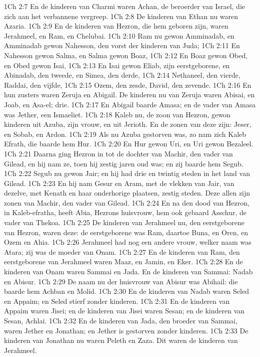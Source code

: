 1Ch 2:7  En de kinderen van Charmi waren Achan, de beroerder van Israel, die zich aan het verbannene vergreep.
1Ch 2:8  De kinderen van Ethan nu waren Azaria.
1Ch 2:9  En de kinderen van Hezron, die hem geboren zijn, waren Jerahmeel, en Ram, en Chelubai.
1Ch 2:10  Ram nu gewon Amminadab, en Amminadab gewon Nahesson, den vorst der kinderen van Juda;
1Ch 2:11  En Nahesson gewon Salma, en Salma gewon Boaz,
1Ch 2:12  En Boaz gewon Obed, en Obed gewon Isai,
1Ch 2:13  En Isai gewon Eliab, zijn eerstgeborene, en Abinadab, den tweede, en Simea, den derde,
1Ch 2:14  Nethaneel, den vierde, Raddai, den vijfde,
1Ch 2:15  Ozem, den zesde, David, den zevende.
1Ch 2:16  En hun zusters waren Zeruja en Abigail. De kinderen nu van Zeruja waren Abisai, en Joab, en Asa-el; drie.
1Ch 2:17  En Abigail baarde Amasa; en de vader van Amasa was Jether, een Ismaeliet.
1Ch 2:18  Kaleb nu, de zoon van Hezron, gewon kinderen uit Azuba, zijn vrouw, en uit Jerioth. En de zonen van deze zijn: Jeser, en Sobab, en Ardon.
1Ch 2:19  Als nu Azuba gestorven was, zo nam zich Kaleb Efrath, die baarde hem Hur.
1Ch 2:20  En Hur gewon Uri, en Uri gewon Bezaleel.
1Ch 2:21  Daarna ging Hezron in tot de dochter van Machir, den vader van Gilead, en hij nam ze, toen hij zestig jaren oud was; en zij baarde hem Segub.
1Ch 2:22  Segub nu gewon Jair; en hij had drie en twintig steden in het land van Gilead.
1Ch 2:23  En hij nam Gesur en Aram, met de vlekken van Jair, van dezelve, met Kenath en haar onderhorige plaatsen, zestig steden. Deze allen zijn zonen van Machir, den vader van Gilead.
1Ch 2:24  En na den dood van Hezron, in Kaleb-efratha, heeft Abia, Hezrons huisvrouw, hem ook gebaard Asschur, de vader van Thekoa.
1Ch 2:25  De kinderen van Jerahmeel nu, den eerstgeborene van Hezron, waren deze: de eerstgeborene was Ram, daartoe Buna, en Oren, en Ozem en Ahia.
1Ch 2:26  Jerahmeel had nog een andere vrouw, welker naam was Atara; zij was de moeder van Onam.
1Ch 2:27  En de kinderen van Ram, den eerstgeborene van Jerahmeel waren Maaz, en Jamin, en Eker.
1Ch 2:28  En de kinderen van Onam waren Sammai en Jada. En de kinderen van Sammai: Nadab en Abisur.
1Ch 2:29  De naam nu der huisvrouw van Abisur was Abihail: die baarde hem Achban en Molid.
1Ch 2:30  En de kinderen van Nadab waren Seled en Appaim; en Seled stierf zonder kinderen.
1Ch 2:31  En de kinderen van Appaim waren Jisei; en de kinderen van Jisei waren Sesan; en de kinderen van Sesan, Achlai.
1Ch 2:32  En de kinderen van Jada, den broeder van Sammai, waren Jether en Jonathan; en Jether is gestorven zonder kinderen.
1Ch 2:33  De kinderen van Jonathan nu waren Peleth en Zaza. Dit waren de kinderen van Jerahmeel.
